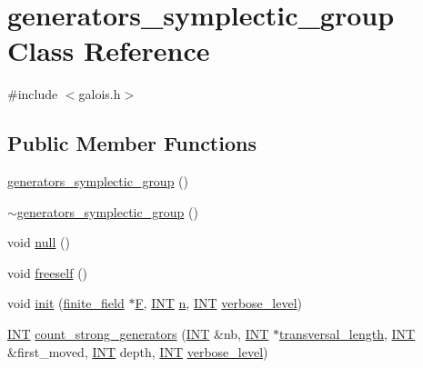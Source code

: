 \hypertarget{classgenerators__symplectic__group}{}\section{generators\+\_\+symplectic\+\_\+group Class Reference}
\label{classgenerators__symplectic__group}


{\ttfamily \#include $<$galois.\+h$>$}

\subsection*{Public Member Functions}
\begin{DoxyCompactItemize}
\item 
\mbox{\hyperlink{classgenerators__symplectic__group_a36809ba6cf2d4f498b355faf791dbdd7}{generators\+\_\+symplectic\+\_\+group}} ()
\item 
\mbox{\hyperlink{classgenerators__symplectic__group_af38f787a359e3547b7e093a7c541468d}{$\sim$generators\+\_\+symplectic\+\_\+group}} ()
\item 
void \mbox{\hyperlink{classgenerators__symplectic__group_abf0d93022536e61263550d86959228c2}{null}} ()
\item 
void \mbox{\hyperlink{classgenerators__symplectic__group_ac65e97312a9d38be33fdf80f33b687c9}{freeself}} ()
\item 
void \mbox{\hyperlink{classgenerators__symplectic__group_a3f0418f9f639b4a2ab1ce3b6ea89233d}{init}} (\mbox{\hyperlink{classfinite__field}{finite\+\_\+field}} $\ast$\mbox{\hyperlink{classgenerators__symplectic__group_a23b96f6bf23dea5c84c7d23146727fb2}{F}}, \mbox{\hyperlink{galois_8h_a09fddde158a3a20bd2dcadb609de11dc}{I\+NT}} \mbox{\hyperlink{classgenerators__symplectic__group_af0242bc0c4ad850767049c7a19b4bbfd}{n}}, \mbox{\hyperlink{galois_8h_a09fddde158a3a20bd2dcadb609de11dc}{I\+NT}} \mbox{\hyperlink{simeon_8_c_a818073fbcc2f439e7c56952f67386122}{verbose\+\_\+level}})
\item 
\mbox{\hyperlink{galois_8h_a09fddde158a3a20bd2dcadb609de11dc}{I\+NT}} \mbox{\hyperlink{classgenerators__symplectic__group_adae8eb63b9aac802572e94b144dd27a5}{count\+\_\+strong\+\_\+generators}} (\mbox{\hyperlink{galois_8h_a09fddde158a3a20bd2dcadb609de11dc}{I\+NT}} \&nb, \mbox{\hyperlink{galois_8h_a09fddde158a3a20bd2dcadb609de11dc}{I\+NT}} $\ast$\mbox{\hyperlink{classgenerators__symplectic__group_aa4c4eec18e4fffc8485444e7366e7863}{transversal\+\_\+length}}, \mbox{\hyperlink{galois_8h_a09fddde158a3a20bd2dcadb609de11dc}{I\+NT}} \&first\+\_\+moved, \mbox{\hyperlink{galois_8h_a09fddde158a3a20bd2dcadb609de11dc}{I\+NT}} depth, \mbox{\hyperlink{galois_8h_a09fddde158a3a20bd2dcadb609de11dc}{I\+NT}} \mbox{\hyperlink{simeon_8_c_a818073fbcc2f439e7c56952f67386122}{verbose\+\_\+level}})

\end{DoxyCompactItemize}
